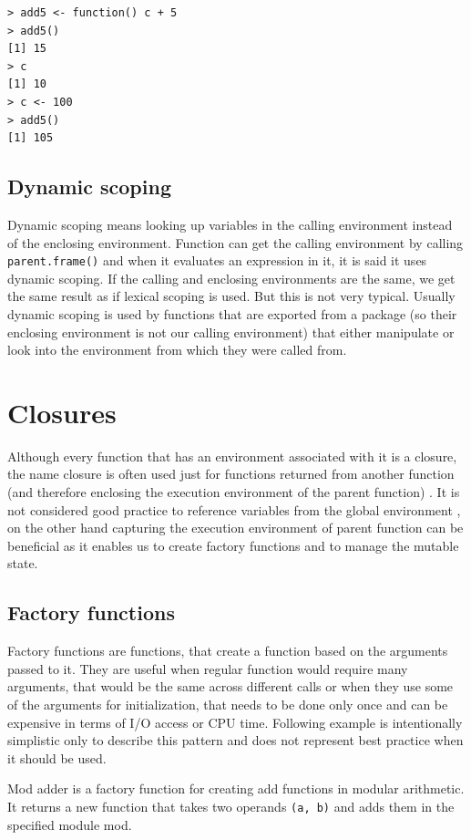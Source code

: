 \documentclass[thesis=B,english]{FITthesis}[2012/10/20]
\begin{document}
\begin{verbatim}
> add5 <- function() c + 5
> add5()
[1] 15
> c
[1] 10
> c <- 100
> add5()
[1] 105
\end{verbatim}

\subsection{Dynamic scoping}
Dynamic scoping means looking up variables in the calling environment instead of the enclosing environment. Function can get the calling environment by calling \verb|parent.frame()| and when it evaluates an expression in it, it is said it uses dynamic scoping. If the calling and enclosing environments are the same, we get the same result as if lexical scoping is used. But this is not very typical. Usually dynamic scoping is used by functions that are exported from a package (so their enclosing environment is not our calling environment) that either manipulate or look into the environment from which they were called from.

\section{Closures}
Although every function that has an environment associated with it is a closure, the name closure is often used just for functions returned from another function (and therefore enclosing the execution environment of the parent function) \cite{advR}. It is not considered good practice to reference variables from the global environment \cite{advR}, on the other hand capturing the execution environment of parent function can be beneficial as it enables us to create factory functions and to manage the mutable state.

\subsection{Factory functions}
Factory functions are functions, that create a function based on the arguments passed to it. They are useful when regular function would require many arguments, that would be the same across different calls or when they use some of the arguments for initialization, that needs to be done only once and can be expensive in terms of I/O access or CPU time. Following example is intentionally simplistic only to describe this pattern and does not represent best practice when it should be used.

Mod adder is a factory function for creating add functions in modular arithmetic. It returns a new function that takes two operands \verb|(a, b)| and adds them in the specified module mod.
\end{document}
